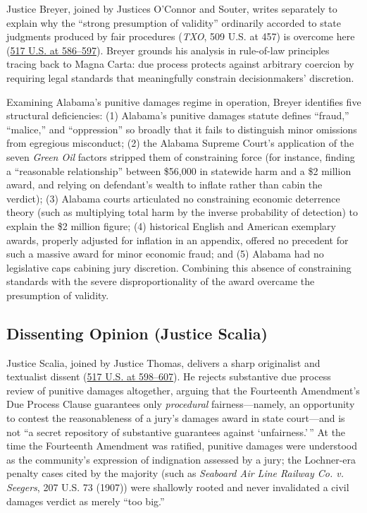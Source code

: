 \documentclass[12pt]{article}
\begin{document}
Justice Breyer, joined by Justices O'Connor and Souter, writes separately to explain why the ``strong presumption of validity'' ordinarily accorded to state judgments produced by fair procedures (\textit{TXO}, 509 U.S. at 457) is overcome here (\href{https://supreme.justia.com/cases/federal/us/517/559/}{517 U.S. at 586--597}). Breyer grounds his analysis in rule-of-law principles tracing back to Magna Carta: due process protects against arbitrary coercion by requiring legal standards that meaningfully constrain decisionmakers' discretion.

Examining Alabama's punitive damages regime in operation, Breyer identifies five structural deficiencies: (1) Alabama's punitive damages statute defines ``fraud,'' ``malice,'' and ``oppression'' so broadly that it fails to distinguish minor omissions from egregious misconduct; (2) the Alabama Supreme Court's application of the seven \textit{Green Oil} factors stripped them of constraining force (for instance, finding a ``reasonable relationship'' between \$56,000 in statewide harm and a \$2 million award, and relying on defendant's wealth to inflate rather than cabin the verdict); (3) Alabama courts articulated no constraining economic deterrence theory (such as multiplying total harm by the inverse probability of detection) to explain the \$2 million figure; (4) historical English and American exemplary awards, properly adjusted for inflation in an appendix, offered no precedent for such a massive award for minor economic fraud; and (5) Alabama had no legislative caps cabining jury discretion. Combining this absence of constraining standards with the severe disproportionality of the award overcame the presumption of validity.

\subsection{Dissenting Opinion (Justice Scalia)}

Justice Scalia, joined by Justice Thomas, delivers a sharp originalist and textualist dissent (\href{https://supreme.justia.com/cases/federal/us/517/559/}{517 U.S. at 598--607}). He rejects substantive due process review of punitive damages altogether, arguing that the Fourteenth Amendment's Due Process Clause guarantees only \textit{procedural} fairness---namely, an opportunity to contest the reasonableness of a jury's damages award in state court---and is not ``a secret repository of substantive guarantees against `unfairness.'\,'' At the time the Fourteenth Amendment was ratified, punitive damages were understood as the community's expression of indignation assessed by a jury; the Lochner-era penalty cases cited by the majority (such as \textit{Seaboard Air Line Railway Co. v. Seegers}, 207 U.S. 73 (1907)) were shallowly rooted and never invalidated a civil damages verdict as merely ``too big.''
\end{document}
